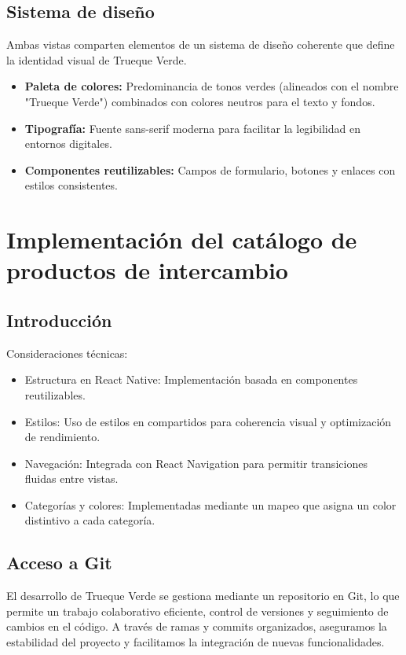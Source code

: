 \documentclass[11pt, a4paper, oneside]{book}
\begin{document}
\section{Sistema de diseño}
Ambas vistas comparten elementos de un sistema de diseño coherente que define
 la identidad visual de Trueque Verde.

\begin{itemize}
    \item \textbf{ Paleta de colores:}  Predominancia de tonos verdes (alineados con el
 nombre "Trueque Verde") combinados con
 colores neutros para el texto y fondos. 
 
    \item \textbf{Tipografía:}  Fuente sans-serif moderna para facilitar la
 legibilidad en entornos digitales.
 
    \item \textbf{ Componentes reutilizables:}  Campos de formulario, botones y enlaces con
 estilos consistentes.
 \end{itemize}





\chapter{Implementación del catálogo de productos de intercambio}
\noindent 
\section{Introducción}

Consideraciones técnicas:
\begin{itemize}
\item Estructura en React Native: Implementación basada en componentes reutilizables.
\item Estilos: Uso de estilos en compartidos para coherencia visual y optimización de rendimiento.
\item Navegación: Integrada con React Navigation para permitir transiciones fluidas entre vistas.
\item Categorías y colores: Implementadas mediante un mapeo que asigna un color distintivo a cada categoría.
\end{itemize}


\section{Acceso a Git}
El desarrollo de Trueque Verde se gestiona mediante un repositorio en Git, lo que permite un trabajo colaborativo eficiente, control de versiones y seguimiento de cambios en el código. A través de ramas y commits organizados, aseguramos la estabilidad del proyecto y facilitamos la integración de nuevas funcionalidades.
\end{document}
